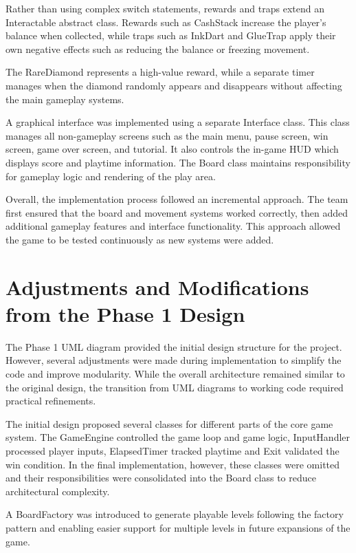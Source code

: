 \documentclass[12pt]{article}
\begin{document}
Rather than using complex switch statements, rewards and traps extend an Interactable abstract class. Rewards such as CashStack increase the player's balance when collected, while traps such as InkDart and GlueTrap apply their own negative effects such as reducing the balance or freezing movement.

The RareDiamond represents a high-value reward, while a separate timer manages when the diamond randomly appears and disappears without affecting the main gameplay systems.

A graphical interface was implemented using a separate Interface class. This class manages all non-gameplay screens such as the main menu, pause screen, win screen, game over screen, and tutorial. It also controls the in-game HUD which displays score and playtime information. The Board class maintains responsibility for gameplay logic and rendering of the play area.

Overall, the implementation process followed an incremental approach. The team first ensured that the board and movement systems worked correctly, then added additional gameplay features and interface functionality. This approach allowed the game to be tested continuously as new systems were added.

\section{Adjustments and Modifications from the Phase 1 Design}

The Phase 1 UML diagram provided the initial design structure for the project. However, several adjustments were made during implementation to simplify the code and improve modularity. While the overall architecture remained similar to the original design, the transition from UML diagrams to working code required practical refinements.

The initial design proposed several classes for different parts of the core game system. The GameEngine controlled the game loop and game logic, InputHandler processed player inputs, ElapsedTimer tracked playtime and Exit validated the win condition. In the final implementation, however, these classes were omitted and their responsibilities were consolidated into the Board class to reduce architectural complexity.

A BoardFactory was introduced to generate playable levels following the factory pattern and enabling easier support for multiple levels in future expansions of the game.
\end{document}
